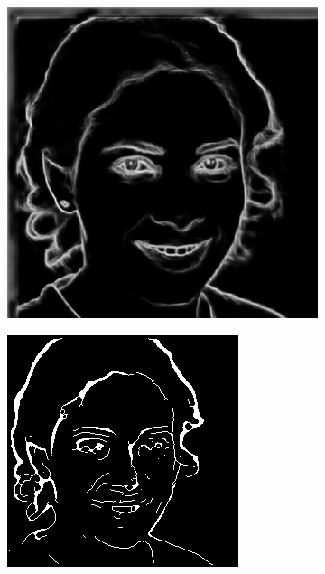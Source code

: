 \documentclass{70_styles/svproc}
\begin{document}
\begin{figure}
\begin{subfigure}[b]{0.2\textwidth}
     \end{subfigure}
     \begin{subfigure}[b]{0.2\textwidth}
         \centering
         \includegraphics[width=\textwidth]{70_figures/HED_seed0028.png}
     \end{subfigure}
     \begin{subfigure}[b]{0.2\textwidth}
         \centering
         \includegraphics[width=\textwidth]{70_figures/seed0028_EM.png}

\end{subfigure}
\end{figure}
\end{document}
